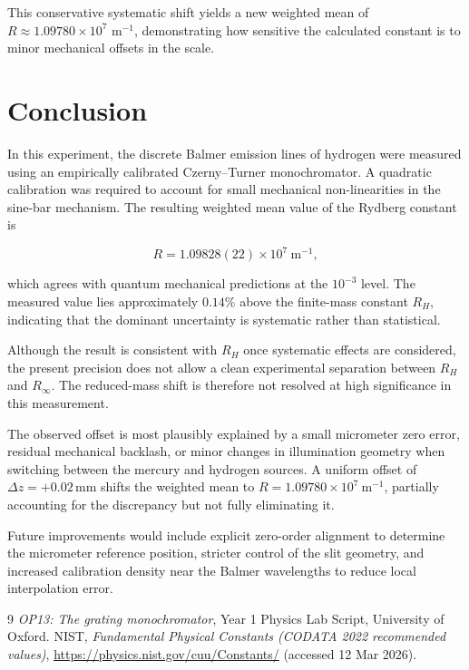 \documentclass[12pt]{article}
\begin{document}
This conservative systematic shift yields a new weighted mean of $R \approx \boxed{1.09780 \times 10^7 \text{ m}^{-1}}$, demonstrating how sensitive the calculated constant is to minor mechanical offsets in the scale.


\section{Conclusion}

In this experiment, the discrete Balmer emission lines of hydrogen were measured using an empirically calibrated Czerny--Turner monochromator. A quadratic calibration was required to account for small mechanical non-linearities in the sine-bar mechanism. The resulting weighted mean value of the Rydberg constant is

\[
R = 1.09828(22) \times 10^{7}\ \mathrm{m^{-1}},
\]

which agrees with quantum mechanical predictions at the $10^{-3}$ level. The measured value lies approximately $0.14\%$ above the finite-mass constant $R_H$, indicating that the dominant uncertainty is systematic rather than statistical.

Although the result is consistent with $R_H$ once systematic effects are considered, the present precision does not allow a clean experimental separation between $R_H$ and $R_\infty$. The reduced-mass shift is therefore not resolved at high significance in this measurement.

The observed offset is most plausibly explained by a small micrometer zero error, residual mechanical backlash, or minor changes in illumination geometry when switching between the mercury and hydrogen sources. A uniform offset of $\Delta z = +0.02\,\mathrm{mm}$ shifts the weighted mean to $R = 1.09780 \times 10^{7}\ \mathrm{m^{-1}}$, partially accounting for the discrepancy but not fully eliminating it.

Future improvements would include explicit zero-order alignment to determine the micrometer reference position, stricter control of the slit geometry, and increased calibration density near the Balmer wavelengths to reduce local interpolation error.

\newpage
\begin{thebibliography}{9}
 \emph{OP13: The grating monochromator}, Year 1 Physics Lab Script, University of Oxford.
 NIST, \emph{Fundamental Physical Constants (CODATA 2022 recommended values)}, \url{https://physics.nist.gov/cuu/Constants/} (accessed 12 Mar 2026).
\end{thebibliography}
\end{document}
